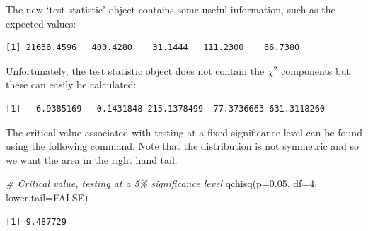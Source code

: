 \documentclass[
  oneside]{krantz}
\newenvironment{Shaded}{\begin{snugshade}}{\end{snugshade}}
\newcommand{\AttributeTok}[1]{\textcolor[rgb]{0.77,0.63,0.00}{#1}}
\newcommand{\CommentTok}[1]{\textcolor[rgb]{0.56,0.35,0.01}{\textit{#1}}}
\newcommand{\ConstantTok}[1]{\textcolor[rgb]{0.00,0.00,0.00}{#1}}
\newcommand{\DecValTok}[1]{\textcolor[rgb]{0.00,0.00,0.81}{#1}}
\newcommand{\FloatTok}[1]{\textcolor[rgb]{0.00,0.00,0.81}{#1}}
\newcommand{\FunctionTok}[1]{\textcolor[rgb]{0.00,0.00,0.00}{#1}}
\newcommand{\NormalTok}[1]{#1}
\newcommand{\OtherTok}[1]{\textcolor[rgb]{0.56,0.35,0.01}{#1}}
\newcommand{\SpecialCharTok}[1]{\textcolor[rgb]{0.00,0.00,0.00}{#1}}
\begin{document}
The new `test statistic' object contains some useful information, such as the expected values:

\begin{Shaded}
\end{Shaded}

\begin{verbatim}
[1] 21636.4596   400.4280    31.1444   111.2300    66.7380
\end{verbatim}

Unfortunately, the test statistic object does not contain the \(\chi^2\) components but these can easily be calculated:

\begin{Shaded}
\end{Shaded}

\begin{verbatim}
[1]   6.9385169   0.1431848 215.1378499  77.3736663 631.3118260
\end{verbatim}

The critical value associated with testing at a fixed significance level can be found using the following command. Note that the distribution is not symmetric and so we want the area in the right hand tail.

\begin{Shaded}
\begin{Highlighting}[]
\CommentTok{\# Critical value, testing at a 5\% significance level}
\FunctionTok{qchisq}\NormalTok{(}\AttributeTok{p=}\FloatTok{0.05}\NormalTok{, }\AttributeTok{df=}\DecValTok{4}\NormalTok{, }\AttributeTok{lower.tail=}\ConstantTok{FALSE}\NormalTok{)}
\end{Highlighting}
\end{Shaded}

\begin{verbatim}
[1] 9.487729
\end{verbatim}
\end{document}
